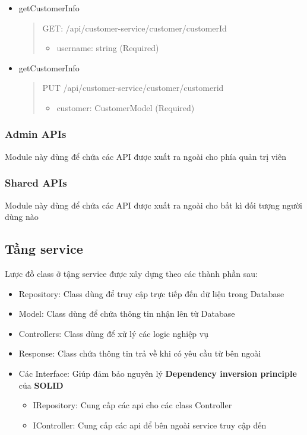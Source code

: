 \begin{itemize}
	\item getCustomerInfo
	\begin{quote}
		GET: /api/customer-service/customer/{customerId}
		\begin{itemize}
			\item username: string (Required)
		\end{itemize}
	\end{quote}
	\item getCustomerInfo
	\begin{quote}
		PUT /api/customer-service/customer/{customerid}
		\begin{itemize}
			\item customer: CustomerModel (Required)
		\end{itemize}
	\end{quote}

\end{itemize}



\subsubsection{Admin APIs}
Module này dùng để chứa các API được xuất ra ngoài cho phía quản trị viên

\subsubsection{Shared APIs}
Module này dùng để chứa các API được xuất ra ngoài cho bất kì đối tượng người dùng nào




\subsection{Tầng service}

Lược đồ class ở tậng service được xây dựng theo các thành phần sau:
\begin{itemize}
	\item Repository: Class dùng để truy cập trực tiếp đến dữ liệu trong Database
	\item Model: Class dùng để chứa thông tin nhận lên từ Database
	\item Controllers: Class dùng để xử lý các logic nghiệp vụ
	\item Response: Class chứa thông tin trả về khi có yêu cầu từ bên ngoài
	\item Các Interface: Giúp đảm bảo nguyên lý \textbf{Dependency inversion principle} của \textbf{SOLID}
	      \begin {itemize}
	\item IRepository: Cung cấp các api cho các class Controller
	\item IController: Cung cấp các api để bên ngoài service truy cập đến
\end{itemize}
\end{itemize}



